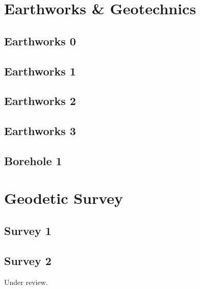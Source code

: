 \documentclass{scrartcl}
\begin{document}
\section{Earthworks \& Geotechnics}
\label{sec:earthworks}

\subsection{Earthworks 0}
\label{sec:earth_0}
\clearpage

\subsection{Earthworks 1}
\label{sec:earth_1}
\clearpage

\subsection{Earthworks 2}
\label{sec:earth_2}
\clearpage

\subsection{Earthworks 3}
\label{sec:earth_3}
\clearpage

\subsection{Borehole 1}
\label{sec:borehole_1}
\clearpage

\section{Geodetic Survey}
\label{sec:geodetic_survey}

\subsection{Survey 1}
\label{sec:survey_1}
\clearpage

\subsection{Survey 2} %
\label{sec:survey_2}
Under review.%
\clearpage
\end{document}
